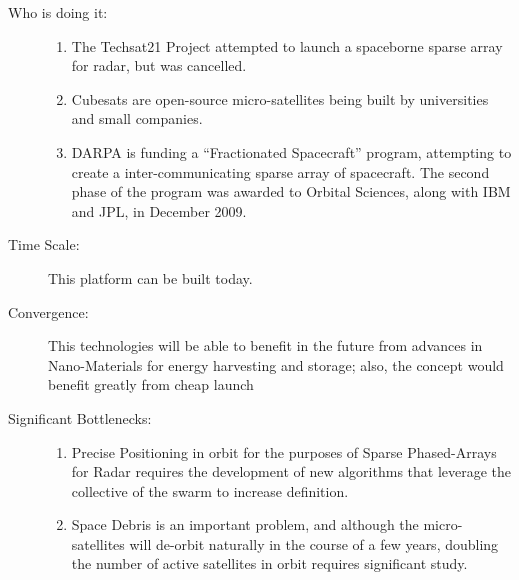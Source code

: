 \begin{description}
  \item[Who is doing it:]
  \hfill\begin{enumerate}
\item The \gls{Techsat21} Project attempted  to launch a spaceborne sparse array for radar, but was cancelled.
\item Cubesats are open-source  micro-satellites being built by universities and small companies.
\item DARPA is funding a ``Fractionated  Spacecraft'' program,  attempting to create a inter-communicating sparse array of spacecraft.  The second phase of the program was awarded to Orbital Sciences, along  with IBM and \gls{JPL}, in December 2009.
 \end{enumerate}
 
  \item[Time Scale:] This platform  can be built today.
 
  \item[Convergence:] This  technologies will be able to benefit in the future from advances in  Nano-Materials for energy harvesting and storage; also, the concept  would benefit greatly from cheap launch
 
  \item[Significant Bottlenecks:]
 \hfill\begin{enumerate}
\item Precise Positioning in orbit for  the purposes of Sparse Phased-Arrays for Radar requires the development  of new algorithms that leverage the collective of the swarm to increase  definition.
\item Space Debris is an important  problem, and although the micro-satellites will de-orbit naturally in  the course of a few years,  doubling the number of active satellites in  orbit requires significant study.
\end{enumerate}
\end{description}
 
 
